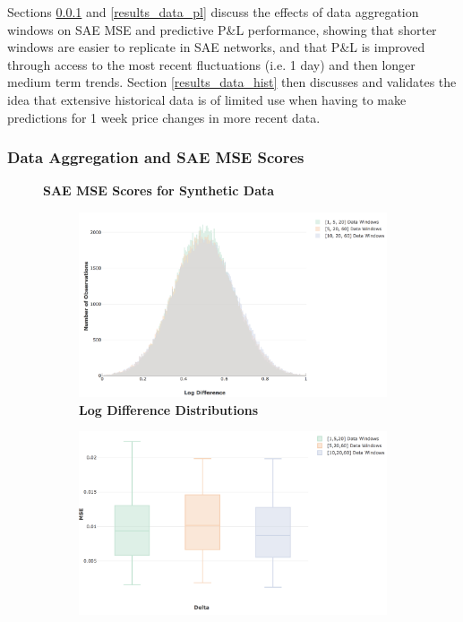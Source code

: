 \documentclass[a4paper,11pt,oneside]{article}
\theoremstyle{plain}
\theoremstyle{definition}
\begin{document}
Sections \ref{results_data_mse} and \ref{results_data_pl} discuss the effects of data aggregation windows on SAE MSE and predictive P\&L performance, showing that shorter windows are easier to replicate in SAE networks, and that P\&L is improved through access to the most recent fluctuations (i.e. 1 day) and then longer medium term trends. Section \ref{results_data_hist} then discusses and validates the idea that extensive historical data is of limited use when having to make predictions for 1 week price changes in more recent data.

\subsubsection{Data Aggregation and SAE MSE Scores}\label{results_data_mse}

\begin{figure}[H]
	\centering
	\textbf{SAE MSE Scores for Synthetic Data}
	\begin{subfigure}{.5\textwidth}
		\centering 
		\includegraphics[scale=0.25]{images/results/data/test_aggregate_dist.png}
		\caption{\textbf{Log Difference Distributions} 
			\newline }
		\label{figure-test_aggregate_dist}
	\end{subfigure}%
	\begin{subfigure}{.5\textwidth}
		\centering 
		\includegraphics[scale=0.26]{images/results/data/test_aggregation_mse.png}

\end{subfigure}
\end{figure}
\end{document}
